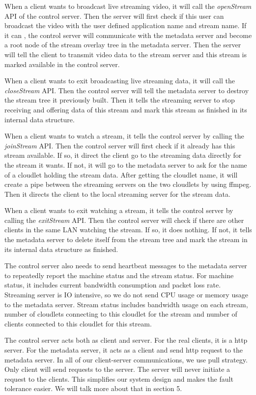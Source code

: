 \documentclass[letterpaper,twocolumn,10pt]{article}
\begin{document}
When a client wants to broadcast live streaming video, it will call the \emph{openStream} API of the control server. Then the server will first check if this user can broadcast the video with the user defined application name and stream name. If it can , the control server will communicate with the metadata server and become a root node of the stream overlay tree in the metadata server. Then the server will tell the client to transmit video data to the stream server and this stream is marked available in the control server.

When a client wants to exit broadcasting live streaming data, it will call the \emph{closeStream} API. Then the control server will tell the metadata server to destroy the stream tree it previously built. Then it tells the streaming server to stop receiving and offering data of this stream and mark this stream as finished in its internal data structure.

When a client wants to watch a stream, it tells the control server by calling the \emph{joinStream} API. Then the control server will first check if it already has this stream available. If so, it direct the client go to the streaming data directly for the stream it wants. If not, it will go to the metadata server to ask for the name of a cloudlet holding the stream data. After getting the cloudlet name, it will create a pipe between the streaming servers on the two cloudlets by using ffmpeg. Then it directs the client to the local streaming server for the stream data.

When a client wants to exit watching a stream, it tells the control server by calling the \emph{exitStream} API. Then the control server will check if there are other clients in the same LAN watching the stream. If so, it does nothing. If not, it tells the metadata server to delete itself from the stream tree and mark the stream in its internal data structure as finished.

The control server also needs to send heartbeat messages to the metadata server to repeatedly report the machine status and the stream status. For machine status, it includes current bandwidth consumption and packet loss rate. Streaming server is IO intensive, so we do not send CPU usage or memory usage to the metadata server. Stream status includes bandwidth usage on each stream, number of cloudlets connecting to this cloudlet for the stream and number of clients connected to this cloudlet for this stream.

The control server acts both as client and server. For the real clients, it is a http server. For the metadata server, it acts as a client and send http request to the metadata server. In all of our client-server communications, we use pull strategy. Only client will send requests to the server. The server will never initiate a request to the clients. This simplifies our system design and makes the fault tolerance easier. We will talk more about that in section 5.
\end{document}
